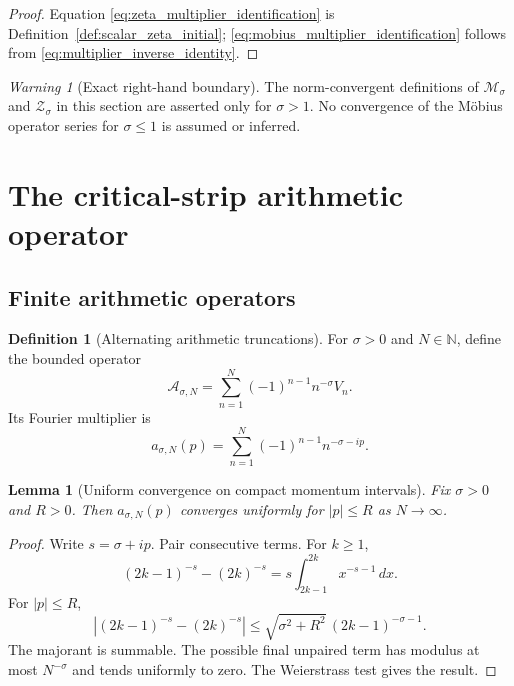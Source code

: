 \documentclass[11pt]{amsart}
\numberwithin{equation}{section}
\theoremstyle{plain}
\newtheorem{lemma}[theorem]{Lemma}
\theoremstyle{definition}
\newtheorem{definition}[theorem]{Definition}
\theoremstyle{remark}
\newtheorem{warning}[theorem]{Warning}
\newcommand{\N}{\mathbb{N}}
\begin{document}
\begin{proof}
Equation \eqref{eq:zeta_multiplier_identification} is
Definition~\ref{def:scalar_zeta_initial};
\eqref{eq:mobius_multiplier_identification} follows from
\eqref{eq:multiplier_inverse_identity}.
\end{proof}

\begin{warning}[Exact right-hand boundary]
\label{warn:sigma_gt_one_only}
The norm-convergent definitions of $\mathcal M_\sigma$ and
$\mathcal Z_\sigma$ in this section are asserted only for $\sigma>1$.
No convergence of the M\"obius operator series for $\sigma\leq1$ is assumed
or inferred.
\end{warning}

\section{The critical-strip arithmetic operator}
\label{sec:critical_strip_operator}

\subsection{Finite arithmetic operators}
\label{subsec:finite_eta_operators}

\begin{definition}[Alternating arithmetic truncations]
\label{def:eta_operator_truncations}
For $\sigma>0$ and $N\in\N$, define the bounded operator
\begin{equation}
\mathcal A_{\sigma,N}
=\sum_{n=1}^{N}(-1)^{n-1}n^{-\sigma}V_n.
\label{eq:eta_operator_truncation}
\end{equation}
Its Fourier multiplier is
\begin{equation}
a_{\sigma,N}(p)
=\sum_{n=1}^{N}(-1)^{n-1}n^{-\sigma-ip}.
\label{eq:eta_multiplier_truncation}
\end{equation}
\end{definition}

\begin{lemma}[Uniform convergence on compact momentum intervals]
\label{lem:eta_uniform_compacts}
Fix $\sigma>0$ and $R>0$.  Then $a_{\sigma,N}(p)$ converges uniformly for
$|p|\leq R$ as $N\to\infty$.
\end{lemma}

\begin{proof}
Write $s=\sigma+ip$.  Pair consecutive terms.  For $k\geq1$,
\begin{equation}
(2k-1)^{-s}-(2k)^{-s}
=s\int_{2k-1}^{2k}x^{-s-1}\,dx.
\label{eq:eta_pair_integral}
\end{equation}
For $|p|\leq R$,
\begin{equation}
\left|
(2k-1)^{-s}-(2k)^{-s}
\right|
\leq
\sqrt{\sigma^2+R^2}\,(2k-1)^{-\sigma-1}.
\label{eq:eta_pair_bound}
\end{equation}
The majorant is summable.  The possible final unpaired term has modulus at
most $N^{-\sigma}$ and tends uniformly to zero.  The Weierstrass test gives
the result.
\end{proof}
\end{document}

